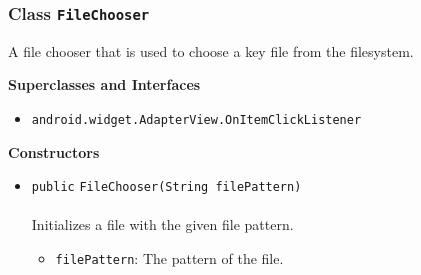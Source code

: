 \subsubsection{Class \lstinline|FileChooser|}
A file chooser that is used to choose a key file from the filesystem. \\
\noindent\begin{minipage}[t]{5cm}
\vspace{0.3em}
\hspace*{2em}
\vspace{0.3em}
\end{minipage}



\textbf{\sffamily Superclasses and Interfaces}
\begin{itemize}
\item \lstinline|android.widget.AdapterView.OnItemClickListener|
\end{itemize}


\textbf{\sffamily Constructors}
\begin{itemize}
\item \lstinline|public| \lstinline|FileChooser|\lstinline|(String filePattern)|\\ \\[-0.6em]
Initializes a file with the given file pattern.
\begin{itemize}
\item \lstinline|filePattern|: The pattern of the file.
\end{itemize}



\end{itemize}


